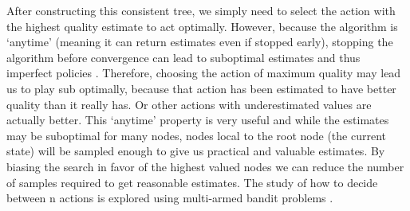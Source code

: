 \documentclass[msc, deptreport, ai, romanprepages]{infthesis}
\begin{document}
After constructing this consistent tree, we simply need to select the action with the highest quality estimate to act optimally. However, because the algorithm is ‘anytime’ (meaning it can return estimates even if stopped early), stopping the algorithm before convergence can lead to suboptimal estimates and thus imperfect policies \cite{Gelly}. Therefore, choosing the action of maximum quality may lead us to play sub optimally, because that action has been estimated to have better quality than it really has. Or other actions with underestimated values are actually better. This ‘anytime’ property is very useful and while the estimates may be suboptimal for many nodes, nodes local to the root node (the current state) will be sampled enough to give us practical and valuable estimates. By biasing the search in favor of the highest valued nodes we can reduce the number of samples required to get reasonable estimates. The study of how to decide between n actions is explored using multi-armed bandit problems \cite{Gelly}. 
\end{document}
